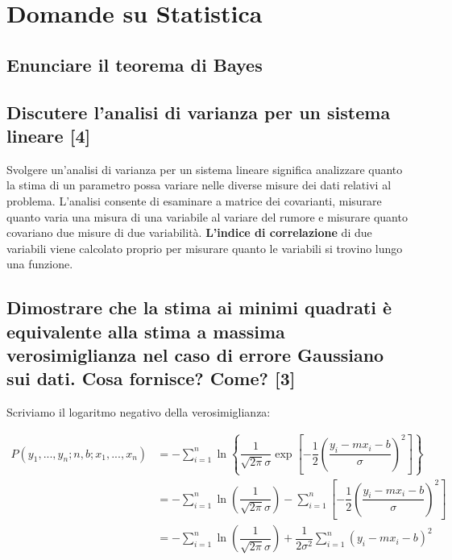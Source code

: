 \documentclass[\main/main.tex]{subfiles}
\begin{document}
\section{Domande su Statistica}

\clearpage

\clearpage


\subsection{Enunciare il teorema di Bayes}
\bayesTh

\subsection{Discutere l'analisi di varianza per un sistema lineare [4]}
Svolgere un'analisi di varianza per un sistema lineare significa analizzare quanto la stima di un parametro possa variare nelle diverse misure dei dati relativi al problema.
L'analisi consente di esaminare a matrice dei covarianti, misurare quanto varia una misura di una variabile al variare del rumore e misurare quanto covariano due misure di due variabilità.
\textbf{L'indice di correlazione} di due variabili viene calcolato proprio per misurare quanto le variabili si trovino lungo una funzione.

\subsection{Dimostrare che la stima ai minimi quadrati è equivalente alla stima a massima verosimiglianza nel caso di errore Gaussiano sui dati. Cosa fornisce? Come? [3]}
Scriviamo il logaritmo negativo della verosimiglianza:

\begin{align}
	P \left(y_1,...,y_n; n, b; x_1, ..., x_n \right) & =
	- \sum_{i=1}^n
	\ln \left\{
	\dfrac{1}{\sqrt{2\pi}\sigma}
	\exp \left[
		-\dfrac{1}{2}	\left(\dfrac{ y_i - mx_i - b}{\sigma} \right)^2
		\right]
	\right\}                                             \\
	                                                 & =
	- \sum_{i=1}^n \ln
	\left ( \dfrac{1}{\sqrt{2\pi}\sigma} \right )
	- \sum_{i=1}^n
	\left[
		-\dfrac{1}{2}	\left(\dfrac{ y_i - mx_i - b}{\sigma} \right)^2
		\right]                                              \\
	                                                 & =
	- \sum_{i=1}^n \ln
	\left ( \dfrac{1}{\sqrt{2\pi}\sigma} \right )
	+ \dfrac{1}{2\sigma^2} \sum_{i=1}^n
	\left(y_i - mx_i - b \right)^2
\end{align}
\end{document}
